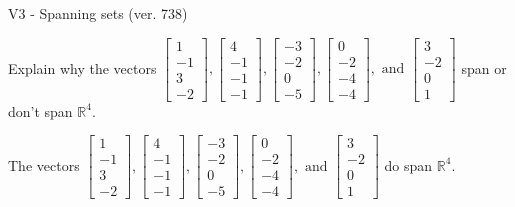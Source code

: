 \begin{exercise}
  \begin{exerciseTitle}V3 - Spanning sets (ver. 738)\end{exerciseTitle}
  \begin{exerciseStatement}
    Explain why the vectors \(\left[\begin{array}{r}
1 \\
-1 \\
3 \\
-2
\end{array}\right] , \left[\begin{array}{r}
4 \\
-1 \\
-1 \\
-1
\end{array}\right] , \left[\begin{array}{r}
-3 \\
-2 \\
0 \\
-5
\end{array}\right] , \left[\begin{array}{r}
0 \\
-2 \\
-4 \\
-4
\end{array}\right] , \text{ and } \left[\begin{array}{r}
3 \\
-2 \\
0 \\
1
\end{array}\right]\) span or don't span \(\mathbb{R}^4\). 
	


  \end{exerciseStatement}
  \begin{exerciseAnswer}
   The vectors \(\left[\begin{array}{r}
1 \\
-1 \\
3 \\
-2
\end{array}\right] , \left[\begin{array}{r}
4 \\
-1 \\
-1 \\
-1
\end{array}\right] , \left[\begin{array}{r}
-3 \\
-2 \\
0 \\
-5
\end{array}\right] , \left[\begin{array}{r}
0 \\
-2 \\
-4 \\
-4
\end{array}\right] , \text{ and } \left[\begin{array}{r}
3 \\
-2 \\
0 \\
1
\end{array}\right]\) 
  	 do  
	span \(\mathbb{R}^4\).
  



\end{exerciseAnswer}
\end{exercise}
